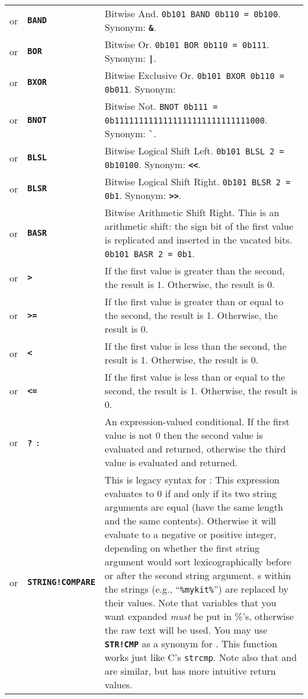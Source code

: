 \documentclass{article}
\def\ttref#1{\ahrefloc{#1}{\tt #1}}
\def\DEFINE#1{{\tt \bf #1}\label{#1}\index{#1}}
\def\DEFSYN#1{{\tt \bf #1}\index{#1}}
\def\t#1{{\tt #1}}
\def\textpipe{|}
\begin{document}
\begin{tabular}{cp{10in}|p{10in}}
or & \ttref{value} \DEFINE{BAND} \ttref{value} & Bitwise And.
\t{0b101 BAND 0b110 = 0b100}. Synonym: \DEFSYN{\&}.\\
or & \ttref{value} \DEFINE{BOR} \ttref{value} & Bitwise Or. 
\t{0b101 BOR 0b110 = 0b111}. Synonym: \DEFSYN{\textpipe}. \\
or & \ttref{value} \DEFINE{BXOR} \ttref{value} & Bitwise Exclusive Or. 
\t{0b101 BXOR 0b110 = 0b011}. Synonym: \DEFSYN{^^}.  \\
or & \DEFINE{BNOT} \ttref{value} & Bitwise Not. 
\t{BNOT 0b111 = 0b1111111111111111111111111111000}. Synonym: \DEFSYN{\verb+`+}. \\
or & \ttref{value} \DEFINE{BLSL} \ttref{value} & Bitwise Logical Shift Left. 
\t{0b101 BLSL 2 = 0b10100}. Synonym: \DEFSYN{<<}. \\
or & \ttref{value} \DEFINE{BLSR} \ttref{value} & Bitwise Logical Shift Right. 
\t{0b101 BLSR 2 = 0b1}. Synonym: \DEFSYN{>>}. \\
or & \ttref{value} \DEFINE{BASR} \ttref{value} & Bitwise Arithmetic Shift Right. 
This is an arithmetic shift: the sign bit of the first value is replicated
and inserted in the vacated bits. \t{0b101 BASR 2 = 0b1}.  \\

or & \ttref{value} \DEFSYN{>} \ttref{value} & If the first value is
greater than the second, the result is 1. Otherwise, the result is 0. \\
or & \ttref{value} \DEFSYN{>=} \ttref{value} & If the first value is
greater than or equal to the second, the result is 1. Otherwise, the result
is 0. \\
or & \ttref{value} \DEFSYN{<} \ttref{value} & If the first value is
less than the second, the result is 1. Otherwise, the result
is 0. \\
or & \ttref{value} \DEFSYN{<=} \ttref{value} & If the first value is
less than or equal to the second, the result is 1. Otherwise, the result
is 0. \\
or & \ttref{value} \DEFSYN{?} \ttref{value} \t{:} \ttref{value} &
An expression-valued conditional.  If the first value is not 0 then the
second value is evaluated and returned, otherwise the third value is
evaluated and returned.  \\

or & \ttref{String} \DEFINE{STRING!COMPARE} \ttref{String} &
This is legacy syntax for \ttref{STRING!EQUAL}:
This expression evaluates to 0 if and only if its two string arguments are
equal (have the same length and the same contents). Otherwise it will evaluate
to a negative or positive integer, depending on whether the first string argument
would sort lexicographically before or after the second string argument.
\ttref{variable}s within the strings (e.g., ``\t{\%mykit\%}'') are replaced by
their values. Note that variables that you want expanded \emph{must} be put in \%'s,
otherwise the raw text will be used.
You may use \DEFINE{STR!CMP} as a synonym for \ttref{STRING!COMPARE}. This
function works just like C's \t{strcmp}.
Note also that \ttref{STRING!EQUAL} and \ttref{STRING!COMPARE} are similar,
but \ttref{STRING!EQUAL} has more intuitive return values. \\


\end{tabular}
\end{document}
